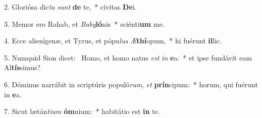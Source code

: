 2. Gloriósa dic\textit{ta} \textit{sunt} \textbf{de} te,~*  cívitas \textbf{De}i.\

3. Memor ero Rahab, et \textit{Ba}\textit{by}\textbf{ló}nis~*  sciénti\textbf{um} me.\

4. Ecce alienígenæ, et Tyrus, et pópu\textit{lus} \textit{Æ}\textbf{thí}opum,~*  hi fuérunt \textbf{il}lic.\

5. Numquid Sion dicet: \dag\  Homo, et homo natus \textit{est} \textit{in} \textbf{e}a:~*  et ipse fundávit eam Al\textbf{tís}simus?\

6. Dóminus narrábit in scriptúris populó\textit{rum}, \textit{et} \textbf{prín}cipum:~*  horum, qui fuérunt in \textbf{e}a.\

7. Sicut lætán\textit{ti}\textit{um} \textbf{óm}nium:~*  habitátio est \textbf{in} te.\

